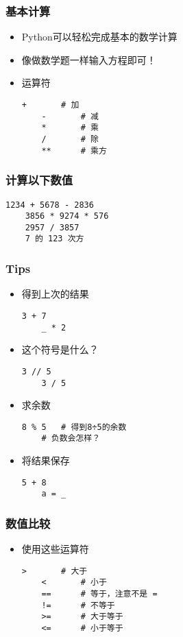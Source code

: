 \begin{CJK}{UTF8}{gbsn}
\begin{frame} [fragile]
	\frametitle{基本计算}
	\begin{itemize}
	\item Python可以轻松完成基本的数学计算
	\item 像做数学题一样输入方程即可！
	\item 运算符
	\begin{lstlisting}[style=pythonstyle, gobble=4, texcl]
	+		# 加
	-		# 减
	*		# 乘
	/		# 除
	**		# 乘方
	\end{lstlisting}
	\end{itemize}
\end{frame}

\begin{frame} [fragile]
	\frametitle{计算以下数值}
	\begin{lstlisting}[style=pythonstyle, gobble=4,
						basicstyle=\linespread{2}\ttfamily]
	1234 + 5678 - 2836
	3856 * 9274 * 576
	2957 / 3857
	7 的 123 次方
	\end{lstlisting}
\end{frame}

\begin{frame} [fragile]
	\frametitle{Tips}
	\begin{itemize}
	\item 得到上次的结果
	\begin{lstlisting}[style=pythonstyle, gobble=4]
	3 + 7
	_ * 2
	\end{lstlisting}
	\item 这个符号是什么？
	\begin{lstlisting}[style=pythonstyle, gobble=4]
	3 // 5
	3 / 5
	\end{lstlisting}
	\item 求余数
	\begin{lstlisting}[style=pythonstyle, gobble=4, texcl]
	8 % 5   # 得到8÷5的余数
	# 负数会怎样？
	\end{lstlisting}
	\item 将结果保存
	\begin{lstlisting}[style=pythonstyle, gobble=4]
	5 + 8
	a = _
	\end{lstlisting}
	\end{itemize}
\end{frame}

\begin{frame} [fragile]
	\frametitle{数值比较}
	\begin{itemize}
	\item 使用这些运算符
	\begin{lstlisting}[style=pythonstyle, gobble=4, texcl,
						basicstyle=\linespread{1.5}\ttfamily]
	>		# 大于
	<		# 小于
	==		# 等于，注意不是 =
	!=		# 不等于
	>=		# 大于等于
	<=		# 小于等于
	\end{lstlisting}
	\end{itemize}
\end{frame}


\end{CJK}
